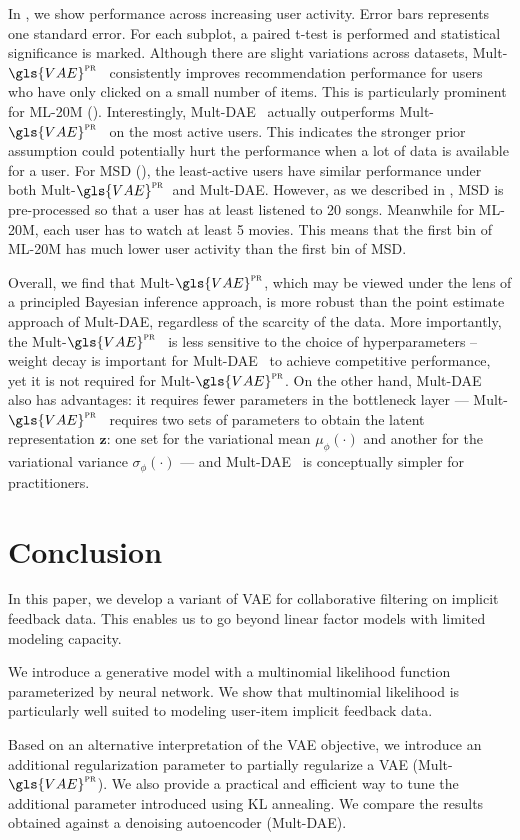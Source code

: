 \documentclass[sigconf]{acmart}
\newcommand{\mathbold}[1]{\ensuremath{\boldsymbol{\mathbf{#1}}}}
\newcommand{\mbz}{\mathbold{z}}
\newcommand{\mvae}{{\small Mult-}$\gls{VAE}^{\text{\sc pr}}$}
\newcommand{\mdae}{{\small Mult-}\gls{DAE}}
\begin{document}
In , we show performance across increasing user activity. Error bars represents one standard error. For each subplot, a paired t-test is performed and statistical significance is marked. Although there are slight variations across
datasets, \mvae~ consistently improves recommendation performance for users who have only clicked on a small number of items. This is particularly prominent for ML-20M (). Interestingly, \mdae~ actually outperforms \mvae~ on the most active users. This indicates the stronger prior assumption could 
potentially hurt the performance when a lot of data is available for a user. 
For MSD (), the least-active users have similar performance under both \mvae~and \mdae. However, as we described in , MSD is pre-processed so that a user has at least listened to 20 songs. Meanwhile for ML-20M, each user has to watch at least 5 movies. This means that the first bin of ML-20M has much lower user activity than the first bin of MSD.  

Overall, we find that \mvae, which may be viewed under the lens of a principled Bayesian inference approach, is more robust than the point estimate approach of \mdae, regardless of the scarcity of the data. More importantly, the \mvae~ is less sensitive to the choice of hyperparameters -- weight decay is important for \mdae~ to achieve competitive performance, yet it is not required for \mvae.
On the other hand, \mdae~ also has advantages: it requires fewer parameters in the bottleneck layer --- \mvae~ requires two sets of parameters to obtain the latent representation $\mbz$: one set for the variational mean $\mu_\phi(\cdot)$ and another for the variational variance $\sigma_\phi(\cdot)$ --- and \mdae~ is conceptually simpler for practitioners. 
 
\section{Conclusion}

In this paper, we develop a variant of \gls{VAE} for collaborative filtering on implicit feedback data. This enables us to go beyond linear factor models with limited modeling capacity. 

We introduce a generative model with a multinomial likelihood function parameterized by neural network. We show that multinomial likelihood is particularly well suited to modeling user-item implicit feedback data. 

Based on an alternative interpretation of the \gls{VAE} objective, we introduce an additional regularization parameter to partially regularize a \gls{VAE} (\mvae). We also provide a practical and efficient way to tune the additional parameter introduced using KL annealing. We compare the results obtained against a denoising autoencoder (\mdae). 
\end{document}
